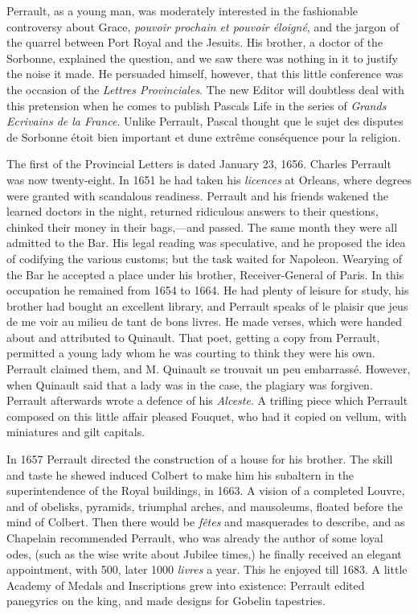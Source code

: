 \documentclass[14pt,a4paper]{memoir}
\begin{document}
Perrault, as a young man, was moderately interested in the fashionable
controversy about Grace, \emph{pouvoir prochain et pouvoir éloigné}, and
the jargon of the quarrel between Port Royal and the Jesuits. His
brother, a doctor of the Sorbonne, explained the question,
\textquotesingle and we saw there was nothing in it to justify the noise
it made.\textquotesingle{} He persuaded himself, however, that this
little conference was the occasion of the \emph{Lettres Provinciales}.
The new Editor will doubtless deal with this pretension when he comes to
publish Pascal\textquotesingle s Life in the series of \emph{Grands
Ecrivains de la France}. Unlike Perrault, Pascal thought
\textquotesingle que le sujet des disputes de Sorbonne étoit bien
important et d\textquotesingle une extrême conséquence pour la
religion.\textquotesingle{}

The first of the Provincial Letters is dated January 23, 1656. Charles
Perrault was now twenty-eight. In 1651 he had taken his \emph{licences}
at Orleans, where degrees were granted with scandalous readiness.
Perrault and his friends wakened the learned doctors in the night,
returned ridiculous answers to their questions, chinked their money in
their bags,---and passed. The same month they were all admitted to the
Bar. His legal reading was speculative, and he proposed the idea of
codifying the various customs; but the task waited for Napoleon.
Wearying of the Bar he accepted a place under his brother,
Receiver-General of Paris. In this occupation he remained from 1654 to
1664. He had plenty of leisure for study, his brother had bought an
excellent library, and Perrault speaks of \textquotesingle le plaisir
que j\textquotesingle eus de me voir au milieu de tant de bons
livres.\textquotesingle{} He made verses, which were handed about and
attributed to Quinault. That poet, getting a copy from Perrault,
permitted a young lady whom he was courting to think they were his own.
Perrault claimed them, and \textquotesingle M. Quinault se trouvait un
peu embarrassé.\textquotesingle{} However, when Quinault said that a
lady was in the case, the plagiary was forgiven. Perrault afterwards
wrote a defence of his \emph{Alceste}. A trifling piece which Perrault
composed on this little affair pleased Fouquet, who had it copied on
vellum, with miniatures and gilt capitals.

In 1657 Perrault directed the construction of a house for his brother.
The skill and taste he shewed induced Colbert to make him his subaltern
in the superintendence of the Royal buildings, in 1663. A vision of a
completed Louvre, and of \textquotesingle obelisks, pyramids, triumphal
arches, and mausoleums,\textquotesingle{} floated before the mind of
Colbert. Then there would be \emph{fêtes} and masquerades to describe,
and as Chapelain recommended Perrault, who was already the author of
some loyal odes, (such as the wise write about Jubilee times,) he
finally received an elegant appointment, with 500, later 1000
\emph{livres} a year. This he enjoyed till 1683. A little Academy of
Medals and Inscriptions grew into existence: Perrault edited panegyrics
on the king, and made designs for Gobelin tapestries.
\end{document}
